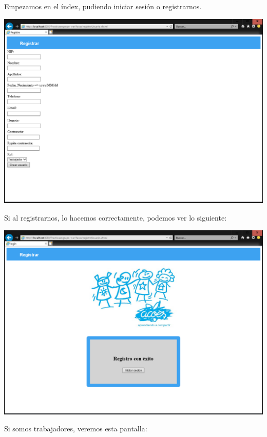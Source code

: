 \documentclass{article}
\begin{document}
Empezamos en el índex, pudiendo iniciar sesión o registrarnos.

\begin{center}
\includegraphics[scale=0.5]{capturas/REGISTRO.PNG}
\end{center}

Si al registrarnos, lo hacemos correctamente, podemos ver lo siguiente:

\begin{center}
\includegraphics[scale=0.5]{capturas/REGISTROCONEXITO.PNG}
\end{center}

Si somos trabajadores, veremos esta pantalla:
\end{document}
